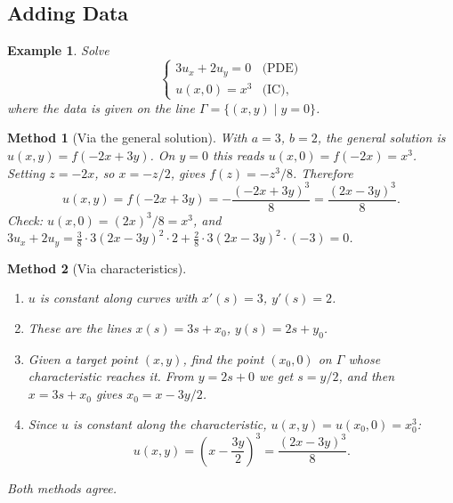 \documentclass{article}
\newtheorem*{example}{Example}
\newtheorem{method}{Method}
\begin{document}
\subsection{Adding Data}
\begin{example}
    Solve
    \begin{equation}
        \begin{cases}
            3u_x + 2u_y = 0 & \text{(PDE)} \\
            u(x,0) = x^3 & \text{(IC)},
        \end{cases}
    \end{equation}
    where the data is given on the line $\Gamma = \{(x,y) \mid y = 0\}$.
\end{example}
\begin{method}[Via the general solution]
    With $a = 3$, $b = 2$, the general solution is $u(x,y) = f(-2x + 3y)$. On $y = 0$ this reads $u(x,0) = f(-2x) = x^3$. Setting $z = -2x$, so $x = -z/2$, gives $f(z) = -z^3/8$. Therefore
    \begin{equation}
        u(x,y) = f(-2x + 3y) = -\frac{(-2x+3y)^3}{8} = \frac{(2x-3y)^3}{8}.
    \end{equation}
    Check: $u(x,0) = (2x)^3/8 = x^3$, and $3u_x + 2u_y = \tfrac{3}{8}\cdot 3(2x-3y)^2 \cdot 2 + \tfrac{2}{8}\cdot 3(2x-3y)^2 \cdot (-3) = 0$.
\end{method}
\begin{method}[Via characteristics]
    \begin{enumerate}[label=(\arabic*)]
        \item $u$ is constant along curves with $x'(s) = 3$, $y'(s) = 2$.
        \item These are the lines $x(s) = 3s + x_0$, $y(s) = 2s + y_0$.
        \item Given a target point $(x,y)$, find the point $(x_0, 0)$ on $\Gamma$ whose characteristic reaches it. From $y = 2s + 0$ we get $s = y/2$, and then $x = 3s + x_0$ gives $x_0 = x - 3y/2$.
        \item Since $u$ is constant along the characteristic, $u(x,y) = u(x_0, 0) = x_0^3$:
        \begin{equation}
            u(x,y) = \left( x - \frac{3y}{2} \right)^3 = \frac{(2x-3y)^3}{8}.
        \end{equation}
    \end{enumerate}
    Both methods agree.
\end{method}
\end{document}
